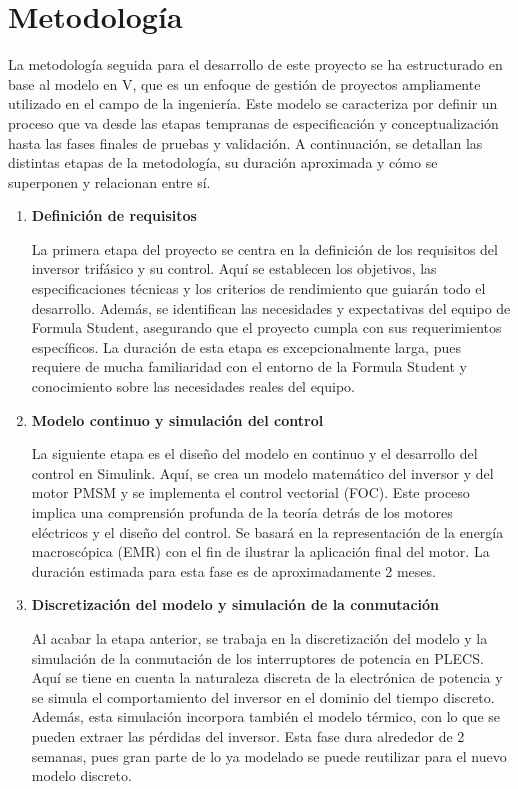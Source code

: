 \chapter{Metodología}

La metodología seguida para el desarrollo de este proyecto se ha estructurado en base al modelo en V, que es un enfoque de gestión de proyectos ampliamente utilizado en el campo de la ingeniería. Este modelo se caracteriza por definir un proceso que va desde las etapas tempranas de especificación y conceptualización hasta las fases finales de pruebas y validación. A continuación, se detallan las distintas etapas de la metodología, su duración aproximada y cómo se superponen y relacionan entre sí.

\vspace{20pt}

\begin{enumerate}
\item \textbf{Definición de requisitos}

La primera etapa del proyecto se centra en la definición de los requisitos del inversor trifásico y su control. Aquí se establecen los objetivos, las especificaciones técnicas y los criterios de rendimiento que guiarán todo el desarrollo. Además, se identifican las necesidades y expectativas del equipo de Formula Student, asegurando que el proyecto cumpla con sus requerimientos específicos. La duración de esta etapa es excepcionalmente larga, pues requiere de mucha familiaridad con el entorno de la Formula Student y conocimiento sobre las necesidades reales del equipo.

\item \textbf{Modelo continuo y simulación del control}

La siguiente etapa es el diseño del modelo en continuo y el desarrollo del control en Simulink. Aquí, se crea un modelo matemático del inversor y del motor PMSM y se implementa el control vectorial (FOC). Este proceso implica una comprensión profunda de la teoría detrás de los motores eléctricos y el diseño del control. Se basará en la representación de la energía macroscópica (EMR) con el fin de ilustrar la aplicación final del motor. La duración estimada para esta fase es de aproximadamente 2 meses.

\item \textbf{Discretización del modelo y simulación de la conmutación}

Al acabar la etapa anterior, se trabaja en la discretización del modelo y la simulación de la conmutación de los interruptores de potencia en PLECS. Aquí se tiene en cuenta la naturaleza discreta de la electrónica de potencia y se simula el comportamiento del inversor en el dominio del tiempo discreto. Además, esta simulación incorpora también el modelo térmico, con lo que se pueden extraer las pérdidas del inversor. Esta fase dura alrededor de 2 semanas, pues gran parte de lo ya modelado se puede reutilizar para el nuevo modelo discreto.


\end{enumerate}
